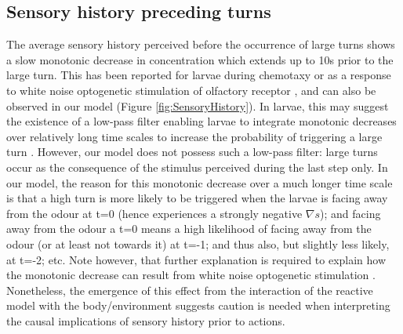 \documentclass[11pt,a4paper]{article}
\newcommand{\todoBW}[1]{\todo[author=BW,color=orange, size=\tiny,inline]{1}}
\begin{document}
\subsection{Sensory history preceding turns}
The average sensory history perceived before the occurrence of large turns shows a slow monotonic decrease in concentration which extends up to 10s prior to the large turn. This has been reported for larvae during chemotaxy \citep{gomez2011active} or as a response to white noise optogenetic stimulation of olfactory receptor \citep{gepner2015computations}, and can also be observed in our model (Figure \ref{fig:SensoryHistory}). In larvae, this may suggest the existence of a low-pass filter enabling larvae to integrate monotonic decreases over relatively long time scales to increase the probability of triggering a large turn \citep{gomez2011active,davies2015model,gepner2015computations}. However, our model does not possess such a low-pass filter: large turns occur as the consequence of the stimulus perceived during the last step only.
 In our model, the reason for this monotonic decrease over a much longer time scale is that a high turn is more likely to be triggered when the larvae is facing away from the odour at t=0 (hence experiences a strongly negative $\nabla s$); and facing away from the odour a t=0 means a high likelihood of facing away from the odour (or at least not towards it) at t=-1; and thus also, but slightly less likely, at t=-2; etc.  Note however, that further explanation is required to explain how the monotonic decrease can result from white noise optogenetic stimulation \cite{gepner2015computations}. Nonetheless, the emergence of this effect from the interaction of the reactive model with the body/environment suggests caution is needed when interpreting the causal implications of sensory history prior to actions.
 
 
\end{document}
